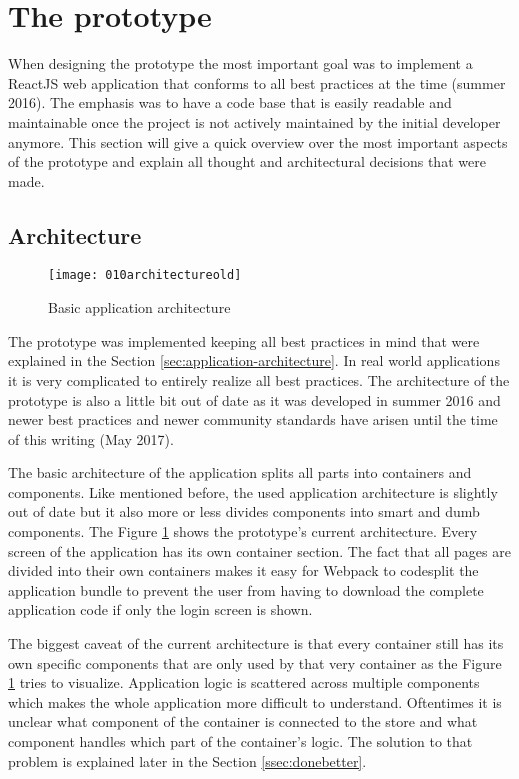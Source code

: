 \section{The prototype}

When designing the prototype the most important goal was to implement a ReactJS web application that conforms to all best practices at the time (summer 2016). The emphasis was to have a code base that is easily readable and maintainable once the project is not actively maintained by the initial developer anymore. This section will give a quick overview over the most important aspects of the prototype and explain all thought and architectural decisions that were made.

\subsection{Architecture} \label{ssec:protarchitecture}

\begin{figure}
  \centering
  \texttt{[image: 010architectureold]}
  \caption{Basic application architecture}
  \label{fig:architectureold}
\end{figure}

The prototype was implemented keeping all best practices in mind that were explained in the Section \ref{sec:application-architecture}. In real world applications it is very complicated to entirely realize all best practices. The architecture of the prototype is also a little bit out of date as it was developed in summer 2016 and newer best practices and newer community standards have arisen until the time of this writing (May 2017).

The basic architecture of the application splits all parts into containers and components. Like mentioned before, the used application architecture is slightly out of date but it also more or less divides components into smart and dumb components. The Figure \ref{fig:architectureold} shows the prototype's current architecture. Every screen of the application has its own container section. The fact that all pages are divided into their own containers makes it easy for Webpack to codesplit the application bundle to prevent the user from having to download the complete application code if only the login screen is shown.

The biggest caveat of the current architecture is that every container still has its own specific components that are only used by that very container as the Figure \ref{fig:architectureold} tries to visualize. Application logic is scattered across multiple components which makes the whole application more difficult to understand. Oftentimes it is unclear what component of the container is connected to the store and what component handles which part of the container's logic. The solution to that problem is explained later in the Section \ref{ssec:donebetter}.


